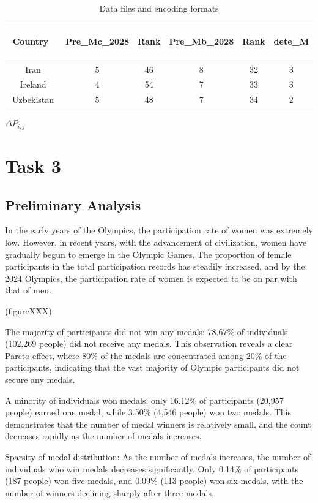 \documentclass{mcmthesis}
\begin{document}
\begin{table}
\centering
\caption{Data files and encoding formats}
\begin{tabular}{|c|ccccc|} 
\hline
~ ~ Country~ ~~ & Pre\_Mc\_2028 & Rank & Pre\_Mb\_2028 & Rank & dete\_M  \\ 
\hline
Iran            & 5             & 46   & 8             & 32   & 3        \\
Ireland         & 4             & 54   & 7             & 33   & 3        \\
Uzbekistan      & 5             & 48   & 7             & 34   & 2        \\
\hline
\end{tabular}
\end{table}

$\Delta P_{i, j}$

\section{Task 3}

\subsection{Preliminary Analysis}
In the early years of the Olympics, the participation rate of women was extremely low. However, in recent years, with the advancement of civilization, women have gradually begun to emerge in the Olympic Games. The proportion of female participants in the total participation records has steadily increased, and by the 2024 Olympics, the participation rate of women is expected to be on par with that of men.

(figureXXX)

The majority of participants did not win any medals: 78.67\% of individuals (102,269 people) did not receive any medals. This observation reveals a clear Pareto effect, where 80\% of the medals are concentrated among 20\% of the participants, indicating that the vast majority of Olympic participants did not secure any medals.

A minority of individuals won medals: only 16.12\% of participants (20,957 people) earned one medal, while 3.50\% (4,546 people) won two medals. This demonstrates that the number of medal winners is relatively small, and the count decreases rapidly as the number of medals increases.

Sparsity of medal distribution: As the number of medals increases, the number of individuals who win medals decreases significantly. Only 0.14\% of participants (187 people) won five medals, and 0.09\% (113 people) won six medals, with the number of winners declining sharply after three medals.
\end{document}
